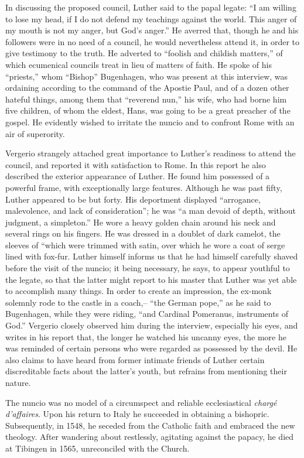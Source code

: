 In discussing the proposed council, Luther said to the papal legate: “I am
willing to lose my head, if I do not defend my teachings against the world.
This anger of my mouth is not my anger, but God’s anger.” He averred
that, though he and his followers were in no need of a council, he would
nevertheless attend it, in order to give testimony to the truth. He adverted
to “foolish and childish matters,” of which ecumenical councils treat in lieu
of matters of faith. He spoke of his “priests,” whom “Bishop” Bugenhagen,
who was present at this interview, was ordaining according to the command
of the Apostie Paul, and of a dozen other hateful things, among them that
“reverend nun,” his wife, who had borne him five children, of whom the
eldest, Hans, was going to be a great preacher of the gospel. He evidently
wished to irritate the nuncio and to confront Rome with an air of superority.

Vergerio strangely attached great importance to Luther’s readiness to
attend the council, and reported it with satisfaction to Rome. In this report
he also described the exterior appearance of Luther. He found him possessed
of a powerful frame, with exceptionally large features. Although he was past
fifty, Luther appeared to be but forty. His deportment displayed “arrogance,
malevolence, and lack of consideration”; he was “a man devoid of depth,
without judgment, a simpleton.” He wore a heavy golden chain around his
neck and several rings on his fingers. He was dressed in a doublet of dark
camelot, the sleeves of “which were trimmed with satin, over which he wore
a coat of serge lined with fox-fur. Luther himself informs us that he had
himself carefully shaved before the visit of the nuncio; it being necessary,
he says, to appear youthful to the legate, so that the latter might report to
his master that Luther was yet able to accomplish many things. In order to
create an impression, the ex-monk solemnly rode to the castle in a coach,--
“the German pope,” as he said to Bugenhagen, while they were riding, “and
Cardinal Pomeranus, instruments of God.” Vergerio closely observed him
during the interview, especially his eyes, and writes in his report that, the
longer he watched his uncanny eyes, the more he was reminded of certain
persons who were regarded as possessed by the devil. He also claims to have
heard from former intimate friends of Luther certain discreditable facts
about the latter’s youth, but refrains from mentioning their nature.

The nuncio was no model of a circumspect and reliable ecclesiastical
\textit{chargé d’affaires}. Upon his return to Italy he succeeded in obtaining
a bishopric. Subsequently, in 1548, he seceded from the
Catholic faith and embraced the new theology. After wandering
about restlessly, agitating against the papacy, he died at Tibingen
in 1565, unreconciled with the Church.

